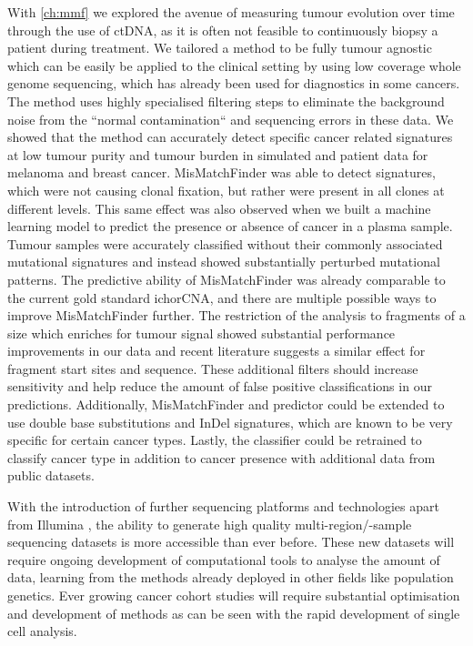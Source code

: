 With \autoref{ch:mmf} we explored the avenue of measuring tumour evolution over time through the use of ctDNA, as it is often not feasible to  continuously biopsy a patient during treatment. We tailored a method to be fully tumour agnostic which can be easily be applied to the clinical setting by using low coverage whole genome sequencing, which has already been used for diagnostics in some cancers. The method uses highly specialised filtering steps to eliminate the background noise from the ``normal contamination`` and sequencing errors in these data. We showed that the method can accurately detect specific cancer related signatures at low tumour purity and tumour burden in simulated and patient data for melanoma and breast cancer. MisMatchFinder was able to detect signatures, which were not causing clonal fixation, but rather were present in all clones at different levels. This same effect was also observed when we built a machine learning model to predict the presence or absence of cancer in a plasma sample. Tumour samples were accurately classified without their commonly associated mutational signatures and instead showed substantially perturbed mutational patterns. The predictive ability of MisMatchFinder was already comparable to the current gold standard ichorCNA, and there are multiple possible ways to improve MisMatchFinder further. The restriction of the analysis to fragments of a size which enriches for tumour signal showed substantial performance improvements in our data and recent literature suggests a similar effect for fragment start sites and sequence. These additional filters should increase sensitivity and help reduce the amount of false positive classifications in our predictions. Additionally, MisMatchFinder and predictor could be extended to use double base substitutions and InDel signatures, which are known to be very specific for certain cancer types. Lastly, the classifier could be retrained to classify cancer type in addition to cancer presence with additional data from public datasets.

With the introduction of further sequencing platforms and technologies apart from Illumina \cite{SingularGenomics2021,UltimaGenomics2022,ElementBiosciences2022}, the ability to generate high quality multi-region/-sample sequencing datasets is more accessible than ever before. These new datasets will require ongoing development of computational tools to analyse the amount of data, learning from the methods already deployed in other fields like population genetics. Ever growing cancer cohort studies will require substantial optimisation and development of methods as can be seen with the rapid development of single cell analysis. 

